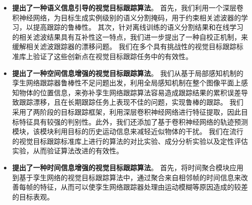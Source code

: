 \begin{itemize}
\item \textbf{提出了一种语义信息引导的视觉目标跟踪算法}。
首先，我们利用一个深层卷积神经网络，为目标生成实例级别的语义分割掩码，用于约束相关滤波器的学习，以提高跟踪的鲁棒性。
其次，针对离线训练的语义分割结果和在线学习的相关滤波结果具有互补性这一特点，我们进一步提出了一种自校正机制，来缓解相关滤波跟踪器的漂移问题。
我们在多个具有挑战性的视觉目标跟踪标准库上验证了这些创新点在视觉目标跟踪任务中的有效性。
\item \textbf{提出了一种空间信息增强的视觉目标跟踪算法}。
我们从基于局部感知机制的孪生网络跟踪器鲁棒性不足问题出发，利用全局感知机制在整个图像平面上感知物体的位置信息，来弥补孪生网络跟踪算法容易造成跟踪结果的累积误差导致跟踪漂移，且在长期跟踪任务上表现不佳的问题，实现鲁棒的跟踪。
我们采用了两阶段的目标跟踪框架，利用深层卷积神经网络进行特征提取，因此目标特征具有较强的判别性。此外，我们还添加了基于卷积神经网络的轨迹预测模块，该模块利用目标的历史运动信息来减轻近似物体的干扰。
我们在流行的视觉目标跟踪标准库上进行的算法的对比实验、成分分析实验以及定性评估实验，从而验证算法改进的有效性。
\item \textbf{提出了一种时间信息增强的视觉目标跟踪算法}。
首先，将时间聚合模块应用到基于孪生网络的视觉目标跟踪算法中，通过聚合来自相邻帧的时间信息来改善每帧的特征，从而可以使孪生网络跟踪器处理由运动模糊等原因造成的较差的目标表观。

\end{itemize}
